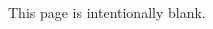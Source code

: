 \documentclass[12pt]{calcexam}
\begin{document}
\begin{multicols*}{2}





%




%


\clearpage%
This page is intentionally blank.\columnbreak%

%




%

%

%

\clearpage
%
%
\end{multicols*}
\end{document}
